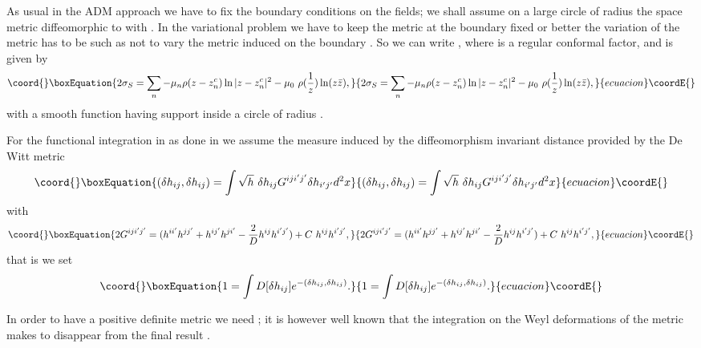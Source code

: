 \documentclass[a4paper,12pt]{article}
\begin{document}
As usual in the ADM approach \cite{ADM} we have to fix the
boundary conditions on the fields; we shall assume on a large circle
of radius \coordHE{} the space metric diffeomorphic to \coordHE{} with \coordHE{}. In the variational problem we
have to keep the metric at the boundary fixed or better the variation
of the metric \coordHE{} has to be such as not to vary the metric
induced on the boundary \cite{wald}.  So we can write
\coordHE{}, where \coordHE{} is a
regular conformal factor, and \coordHE{} is given by
\begin{equation}\coord{}\boxEquation{
2\sigma_S =\sum_n -\mu_n \rho(z-z^c_n)\ln|z-z^c_n|^2 - 
\mu_0~\rho(\frac{1}{z})\ln(z\bar z),
}{
2\sigma_S =\sum_n -\mu_n \rho(z-z^c_n)\ln|z-z^c_n|^2 - 
\mu_0~\rho(\frac{1}{z})\ln(z\bar z),
}{ecuacion}\coordE{}\end{equation}
with \coordHE{} a smooth function having support inside a
circle of radius \coordHE{}.

For the functional integration in \coordHE{} as done in
\cite{carlip,alvarez,polchinski} we
assume the measure induced by the diffeomorphism invariant distance provided by
the De Witt metric
\begin{equation}\coord{}\boxEquation{
(\delta h_{ij}, \delta h_{ij}) = \int\sqrt{h}~ \delta h_{ij}
G^{iji'j'}\delta h_{i'j'}d^2x
}{
(\delta h_{ij}, \delta h_{ij}) = \int\sqrt{h}~ \delta h_{ij}
G^{iji'j'}\delta h_{i'j'}d^2x
}{ecuacion}\coordE{}\end{equation}
with
\begin{equation}\coord{}\boxEquation{
2G^{iji'j'}=(h^{ii'}h^{jj'}+h^{ij'}h^{ji'}-\frac{2}{D}h^{ij}h^{i'j'})+
C~h^{ij}h^{i'j'},
}{
2G^{iji'j'}=(h^{ii'}h^{jj'}+h^{ij'}h^{ji'}-\frac{2}{D}h^{ij}h^{i'j'})+
C~h^{ij}h^{i'j'},
}{ecuacion}\coordE{}\end{equation}
that is we set
\begin{equation}\coord{}\boxEquation{
1=\int D[\delta h_{ij}] e^{-(\delta h_{ij}, \delta h_{ij})}.
}{
1=\int D[\delta h_{ij}] e^{-(\delta h_{ij}, \delta h_{ij})}.
}{ecuacion}\coordE{}\end{equation}

In order to have a positive definite metric we need \coordHE{}; it is
however well known that the integration on the Weyl deformations of the
metric makes \coordHE{} to disappear from the final result
\cite{polyakov,menottipeirano}.
\end{document}
